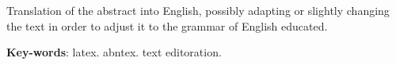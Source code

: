 %
%

\begin{resumo}[Abstract]
	Translation of the abstract into English, possibly adapting or slightly changing the text in order to adjust it to the grammar of English educated.

	\textbf{Key-words}: latex. abntex. text editoration.

\end{resumo}

